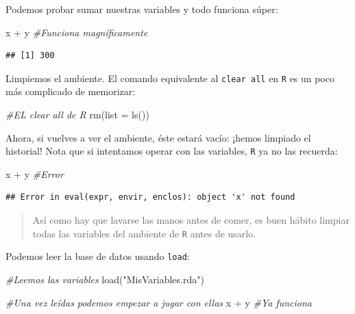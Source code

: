 \documentclass[
]{book}
\newenvironment{Shaded}{\begin{snugshade}}{\end{snugshade}}
\newcommand{\AttributeTok}[1]{\textcolor[rgb]{0.77,0.63,0.00}{#1}}
\newcommand{\CommentTok}[1]{\textcolor[rgb]{0.56,0.35,0.01}{\textit{#1}}}
\newcommand{\FunctionTok}[1]{\textcolor[rgb]{0.00,0.00,0.00}{#1}}
\newcommand{\NormalTok}[1]{#1}
\newcommand{\SpecialCharTok}[1]{\textcolor[rgb]{0.00,0.00,0.00}{#1}}
\newcommand{\StringTok}[1]{\textcolor[rgb]{0.31,0.60,0.02}{#1}}
\begin{document}
Podemos probar sumar nuestras variables y todo funciona súper:

\begin{Shaded}
\begin{Highlighting}[]
\NormalTok{x }\SpecialCharTok{+}\NormalTok{ y }\CommentTok{\#Funciona magníficamente}
\end{Highlighting}
\end{Shaded}

\begin{verbatim}
## [1] 300
\end{verbatim}

Limpiemos el ambiente. El comando equivalente al \texttt{clear\ all} en \texttt{R} es un poco más complicado de memorizar:

\begin{Shaded}
\begin{Highlighting}[]
\CommentTok{\#EL clear all de R}
\FunctionTok{rm}\NormalTok{(}\AttributeTok{list =} \FunctionTok{ls}\NormalTok{())}
\end{Highlighting}
\end{Shaded}

Ahora, si vuelves a ver el ambiente, éste estará vacío: ¡hemos limpiado el historial! Nota que si intentamos operar con las variables, \texttt{R} ya no las recuerda:

\begin{Shaded}
\begin{Highlighting}[]
\NormalTok{x }\SpecialCharTok{+}\NormalTok{ y }\CommentTok{\#Error}
\end{Highlighting}
\end{Shaded}

\begin{verbatim}
## Error in eval(expr, envir, enclos): object 'x' not found
\end{verbatim}

\begin{quote}
Así como hay que lavarse las manos antes de comer, es buen hábito limpiar todas las variables del ambiente de \texttt{R} antes de usarlo.
\end{quote}

Podemos leer la base de datos usando \texttt{load}:

\begin{Shaded}
\begin{Highlighting}[]
\CommentTok{\#Leemos las variables}
\FunctionTok{load}\NormalTok{(}\StringTok{"MisVariables.rda"}\NormalTok{)}

\CommentTok{\#Una vez leídas podemos empezar a jugar con ellas}
\NormalTok{x }\SpecialCharTok{+}\NormalTok{ y }\CommentTok{\#Ya funciona}
\end{Highlighting}
\end{Shaded}
\end{document}
